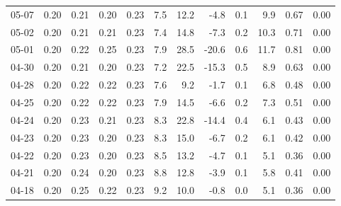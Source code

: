 \begin{threeparttable}
{\begin{tabular}{lrrrrrrrrrrr}
  05-07 &          0.20 &          0.21 &          0.20 &        0.23 &                 7.5 &                12.2 &       -4.8 &                 0.1 &              9.9 &            0.67 &                   0.00 \\
  05-02 &          0.20 &          0.21 &          0.21 &        0.23 &                 7.4 &                14.8 &       -7.3 &                 0.2 &             10.3 &            0.71 &                   0.00 \\
  05-01 &          0.20 &          0.22 &          0.25 &        0.23 &                 7.9 &                28.5 &      -20.6 &                 0.6 &             11.7 &            0.81 &                   0.00 \\
  04-30 &          0.20 &          0.21 &          0.20 &        0.23 &                 7.2 &                22.5 &      -15.3 &                 0.5 &              8.9 &            0.63 &                   0.00 \\
  04-28 &          0.20 &          0.22 &          0.22 &        0.23 &                 7.6 &                 9.2 &       -1.7 &                 0.1 &              6.8 &            0.48 &                   0.00 \\
  04-25 &          0.20 &          0.22 &          0.22 &        0.23 &                 7.9 &                14.5 &       -6.6 &                 0.2 &              7.3 &            0.51 &                   0.00 \\
  04-24 &          0.20 &          0.23 &          0.21 &        0.23 &                 8.3 &                22.8 &      -14.4 &                 0.4 &              6.1 &            0.43 &                   0.00 \\
  04-23 &          0.20 &          0.23 &          0.20 &        0.23 &                 8.3 &                15.0 &       -6.7 &                 0.2 &              6.1 &            0.42 &                   0.00 \\
  04-22 &          0.20 &          0.23 &          0.20 &        0.23 &                 8.5 &                13.2 &       -4.7 &                 0.1 &              5.1 &            0.36 &                   0.00 \\
  04-21 &          0.20 &          0.24 &          0.20 &        0.23 &                 8.8 &                12.8 &       -3.9 &                 0.1 &              5.8 &            0.41 &                   0.00 \\
  04-18 &          0.20 &          0.25 &          0.22 &        0.23 &                 9.2 &                10.0 &       -0.8 &                 0.0 &              5.1 &            0.36 &                   0.00 \\

\end{tabular}}
\end{threeparttable}

